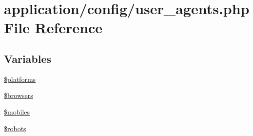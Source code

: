 \hypertarget{user__agents_8php}{\section{application/config/user\-\_\-agents.php File Reference}
\label{user__agents_8php}
}
\subsection*{Variables}
\begin{DoxyCompactItemize}
\item 
\hyperlink{user__agents_8php_a1c1a0a860242698ee6b3f4ef7d6eb343}{\$platforms}
\item 
\hyperlink{user__agents_8php_a81edf933083b5ac5b380385f59074a7d}{\$browsers}
\item 
\hyperlink{user__agents_8php_a6928dde5aa0be443766d5b2376de908a}{\$mobiles}
\item 
\hyperlink{user__agents_8php_a5752e2a66d1c03bc34666492746037ab}{\$robots}
\end{DoxyCompactItemize}



